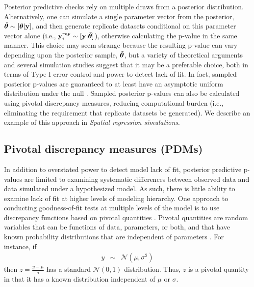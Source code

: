 \documentclass[12pt,english]{article}
\begin{document}
\begin{spacing}{1.9}
Posterior predictive checks rely on multiple draws from a posterior
distribution. Alternatively, one can simulate a single parameter
vector from the posterior, $\tilde{\boldsymbol{\theta}} \sim [\boldsymbol{\theta}| {\bf y}]$,
and then generate replicate datasets conditional on this parameter
vector alone (i.e., ${\bf y}_i^{rep} \sim [{\bf y} | \tilde{\boldsymbol{\theta}}]$),
otherwise calculating the p-value in the same manner.  This choice may
seem strange because the resulting p-value can vary depending upon the
posterior sample, $\tilde{\boldsymbol{\theta}}$, but a variety of theoretical
arguments
\citep[e.g.,][]{Johnson2004,Johnson2007,YuanJohnson2012,Gosselin2011}
and several simulation studies \citep[e.g.,][]{Gosselin2011,Zhang2014}
suggest that it may be a preferable choice, both in terms of Type I
error control and power to detect lack of fit.  In fact, sampled
posterior p-values are guaranteed to at least have an asymptotic
uniform distribution under the null \citep{Gosselin2011}.  Sampled
posterior p-values can also be calculated using pivotal discrepancy
measures, reducing computational burden (i.e., eliminating the
requirement that replicate datasets be generated). We describe an
example of this approach in \textit{Spatial regression simulations}.

\subsection{Pivotal discrepancy measures (PDMs)}

In addition to overstated power to detect model lack of fit, posterior
predictive p-values are limited to examining systematic differences
between observed data and data simulated under a hypothesized model.
As such, there is little ability to examine lack of fit at higher
levels of modeling hierarchy.  One approach to conducting
goodness-of-fit tests at multiple levels of the model is to use
discrepancy functions based on pivotal quantities
\citep{Johnson2004,YuanJohnson2012}.  Pivotal quantities are random
variables that can be functions of data, parameters, or both, and that
have known probability distributions that are independent of
parameters \citep[e.g.,][section 9.2.2]{CasellaBerger1990}.  For
instance, if
\begin{eqnarray*}
  y & \sim & \mathcal{N}(\mu,\sigma^2)
\end{eqnarray*}
then $z = \frac{y-\mu}{\sigma}$ has a standard $\mathcal{N}(0,1)$
distribution. Thus, $z$ is a pivotal quantity in that it has a known
distribution independent of $\mu$ or $\sigma$.


\end{spacing}
\end{document}
